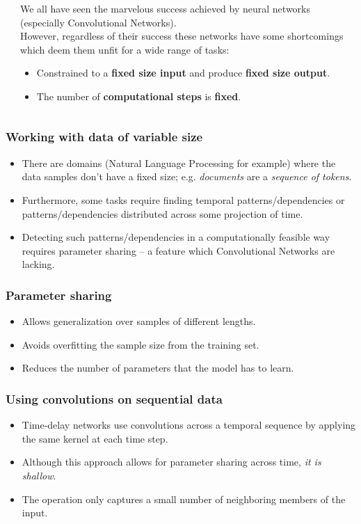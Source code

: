 \documentclass{beamer}
\begin{document}
\begin{frame}
\begin{columns}
\begin{column}{0.3\textwidth}
\begin{center}
      \end{center}
    \end{column}
    \begin{column}{0.7\textwidth}
      We all have seen the marvelous success achieved by neural networks (especially Convolutional Networks).
      \pause \\
      However, regardless of their success these networks have some shortcomings which deem them unfit for a wide range of tasks:
      \begin{itemize}
        \item Constrained to a \textbf{fixed size input} and produce \textbf{fixed size output}.
        \item The number of \textbf{computational steps} is \textbf{fixed}.
      \end{itemize}
    \end{column}
  \end{columns}
\end{frame}
\begin{frame}
  \frametitle{Working with data of variable size}
  \begin{itemize}
    \item There are domains (Natural Language Processing for example) where the data samples don't have a fixed size; e.g. \textit{documents} are a \textit{sequence of tokens}. \pause
    \item Furthermore, some tasks require finding temporal patterns/dependencies or patterns/dependencies distributed across some projection of time. \pause
    \item Detecting such patterns/dependencies in a computationally feasible way requires parameter sharing -- a feature which Convolutional Networks are lacking.
  \end{itemize}
\end{frame}
\begin{frame}
  \frametitle{Parameter sharing}
  \begin{itemize}
    \item Allows generalization over samples of different lengths.
    \item Avoids overfitting the sample size from the training set.
    \item Reduces the number of parameters that the model has to learn.
  \end{itemize}
\end{frame}
\begin{frame}
  \frametitle{Using convolutions on sequential data \cite{goodfellow-et-al-2016}}
  \begin{itemize}
    \item Time-delay networks use convolutions across a temporal sequence by applying the same kernel at each time step.
    \item Although this approach allows for parameter sharing across time, \textit{it is shallow}.
    \item The operation only captures a small number of neighboring members of the input.
  \end{itemize}
\end{frame}
\end{document}
